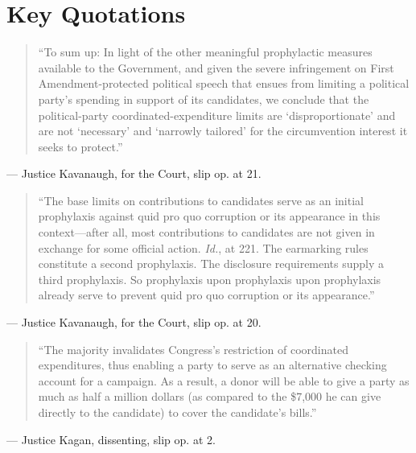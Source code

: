 \documentclass[12pt]{article}
\begin{document}
\section{Key Quotations}

\begin{quote}
``To sum up: In light of the other meaningful prophylactic measures available to the Government, and given the severe infringement on First Amendment-protected political speech that ensues from limiting a political party's spending in support of its candidates, we conclude that the political-party coordinated-expenditure limits are `disproportionate' and are not `necessary' and `narrowly tailored' for the circumvention interest it seeks to protect.''
\end{quote}
\noindent --- Justice Kavanaugh, for the Court, slip op. at 21.

\begin{quote}
``The base limits on contributions to candidates serve as an initial prophylaxis against quid pro quo corruption or its appearance in this context---after all, most contributions to candidates are not given in exchange for some official action. \textit{Id.}, at 221. The earmarking rules constitute a second prophylaxis. The disclosure requirements supply a third prophylaxis. So prophylaxis upon prophylaxis upon prophylaxis already serve to prevent quid pro quo corruption or its appearance.''
\end{quote}
\noindent --- Justice Kavanaugh, for the Court, slip op. at 20.

\begin{quote}
``The majority invalidates Congress's restriction of coordinated expenditures, thus enabling a party to serve as an alternative checking account for a campaign. As a result, a donor will be able to give a party as much as half a million dollars (as compared to the \$7,000 he can give directly to the candidate) to cover the candidate's bills.''
\end{quote}
\noindent --- Justice Kagan, dissenting, slip op. at 2.
\end{document}

